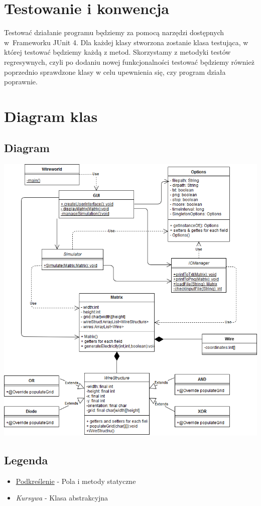 \documentclass[a4paper,12pt]{article}
\begin{document}
\section{Testowanie i konwencja}
Testować działanie programu będziemy za pomocą narzędzi dostępnych w~Frameworku JUnit 4. Dla każdej klasy stworzona zostanie klasa testująca, w której testować będziemy każdą z metod. Skorzystamy z metodyki testów regresywnych, czyli po dodaniu nowej funkcjonalności testować będziemy również poprzednio sprawdzone klasy w celu upewnienia się, czy program działa poprawnie.

\section{Diagram klas}
\subsection{Diagram}
\begin{center}
\includegraphics[scale=0.5]{diag.png}
\end{center}
\subsection{Legenda}
\begin{itemize}
\item \underline{Podkreślenie} - Pola i metody statyczne
\item \textit{Kursywa} - Klasa abstrakcyjna
\end{itemize}
\end{document}
